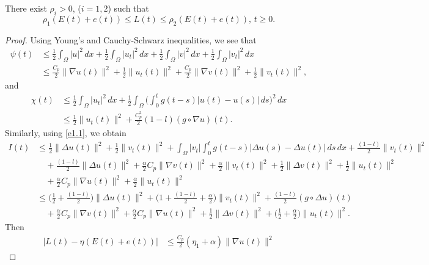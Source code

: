 \begin{proposition} \label{prop11}
There exist \(\rho_i> 0 \), (\( i = 1, 2 \)) such that
\begin{equation}
\rho_1 (E(t)+e(t)) \leq L(t) \leq \rho_2 (E(t)+e(t)),\, t\geq 0. \label{e4.21}
\end{equation}
\end{proposition}

\begin{proof}
Using Young's and Cauchy-Schwarz inequalities, we see that
\begin{align*}
\psi(t)
& \leq \frac{1}{2}\int_{\Omega} |u|^2 \, dx+ \frac{1}{2}\int_{\Omega}|u_t|^2 \, dx
+\frac{1}{2}\int_{\Omega} |v|^2 \, dx+ \frac{1}{2}\int_{\Omega}|v_t|^2 \, dx \\
&\leq \frac{C_p}{2} \| \nabla u(t) \|^2+ \frac{1}{2} \| u_t(t) \|^2
 + \frac{C_p}{2} \| \nabla v(t) \|^2+ \frac{1}{2} \| v_t(t) \|^2,
\end{align*}
and
\begin{align*}
 \chi(t)
&\leq \frac{1}{2}\int_{\Omega}|u_t|^2 \, dx
 +\frac{1}{2} \int_{\Omega} \Big( \int_0^{t} g(t - s)|u(t) - u(s)| \, ds \Big)^2 \, dx
 \\
&\leq \frac{1}{2} \| u_t(t) \|^2+\frac{C_p^2 }{2} (1-l) (g \circ \nabla u)(t).
\end{align*}
Similarly, using \eqref{e1.1}, we obtain
\begin{align*}
I(t)
& \leq \frac{1}{2} \| \Delta u(t) \|^2+\frac{1}{2}\| v_t (t)\|^2
 +\int_{\Omega} | v_t| \int_0^t g(t-s) |\Delta u(s)- \Delta u(t)|\, ds\, dx
 +\frac{(1-l)}{2} \| v_t(t) \|^2\\
&\quad +\frac{(1-l)}{2} \| \Delta u (t)\|^2
 +\frac{\alpha}{2}C_p \| \nabla v(t) \|^2+\frac{\alpha}{2}\| v_t(t) \|^2
  +\frac{1}{2}\| \Delta v(t) \|^2+\frac{1}{2}\| u_t(t) \|^2\\
&\quad  +\frac{\alpha}{2}C_p \| \nabla u(t) \|^2+\frac{\alpha}{2} \| u_t(t) \|^2\\
& \leq \Big( \frac{1}{2}+\frac{(1-l)}{2}\Big)
 \| \Delta u(t)\|^2+\Big(1+\frac{(1-l)}{2}+\frac{\alpha}{2}\Big)
  \| v_t(t) \|^2 +\frac{(1-l)}{2} (g \circ \Delta u)(t)\\
&\quad + \frac{\alpha}{2}C_p \| \nabla v (t)\|^2
 +\frac{\alpha}{2}C_p \| \nabla u (t)\|^2+\frac{1}{2}\| \Delta v(t) \|^2
 +\Big( \frac{1}{2}+\frac{\alpha}{2} \Big) \| u_t (t)\|^2.
\end{align*}
Then
\begin{align*}
|L(t) - \eta (E(t)+ e(t))|
& \leq \frac{C_p }{2}( \eta_1 +\alpha )\| \nabla u(t) \|^2

\end{align*}
\end{proof}
